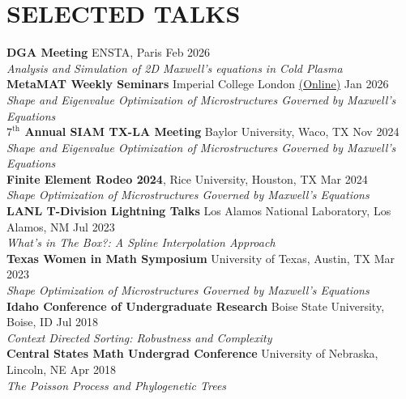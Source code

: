 \documentclass[10pt,a4paper,roman]{moderncv}
\begin{document}
\section{SELECTED TALKS}

\textbf{DGA Meeting}
ENSTA, Paris
\hfill Feb 2026\\
\textit{Analysis and Simulation of 2D Maxwell’s equations in Cold Plasma}\\

\textbf{MetaMAT Weekly Seminars}
Imperial College London \href{https://cassyni.com/events/RX55tyad4JDKfUHPEF9CJR/seminar}{(Online)}
\hfill Jan 2026\\
\textit{Shape and Eigenvalue  Optimization of Microstructures Governed by Maxwell’s Equations}\\

\textbf{$7^{\text{th}}$ Annual SIAM TX-LA Meeting}
Baylor University, Waco, TX
\hfill Nov 2024\\
\textit{Shape and Eigenvalue  Optimization of Microstructures Governed by Maxwell’s Equations}\\

\textbf{Finite Element Rodeo 2024},
Rice University, Houston, TX
\hfill Mar 2024\\
\textit{Shape Optimization of Microstructures Governed by Maxwell’s Equations}\\

\textbf{LANL T-Division Lightning Talks}
Los Alamos National Laboratory, Los Alamos, NM 
\hfill Jul 2023\\
\textit{What's in The Box?: A Spline Interpolation Approach}\\

\textbf{Texas Women in Math Symposium}
University of Texas, Austin, TX
\hfill Mar 2023\\
\textit{Shape Optimization of Microstructures Governed by Maxwell’s Equations}\\

\textbf{Idaho Conference of Undergraduate Research}
Boise State University, Boise, ID
\hfill Jul 2018\\
\textit{Context Directed Sorting: Robustness and Complexity}\\ 

\textbf{Central States Math Undergrad Conference}
University of Nebraska, Lincoln, NE
\hfill Apr 2018\\
\textit{The Poisson Process and Phylogenetic Trees}\\
\end{document}
